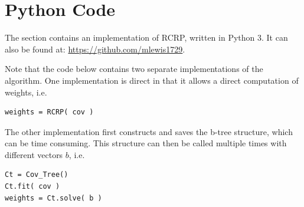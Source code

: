 \documentclass[10pt,twoside,titlepage]{article}   %
\begin{document}
\section{Python Code}\label{sec-AppendixCode}
The section contains an implementation of RCRP, written in Python 3.
It can also be found at: \url{https://github.com/mlewis1729}.

Note that the code below contains two separate implementations of the algorithm.
One implementation is direct in that it allows a direct computation of weights, i.e.

\begin{lstlisting}
weights = RCRP( cov )
\end{lstlisting}
The other implementation first constructs and saves the b-tree structure, which can be time consuming.
This structure can then be called multiple times with different vectors $b$, i.e.
\begin{lstlisting}
Ct = Cov_Tree()
Ct.fit( cov )
weights = Ct.solve( b )
\end{lstlisting}
\end{document}
